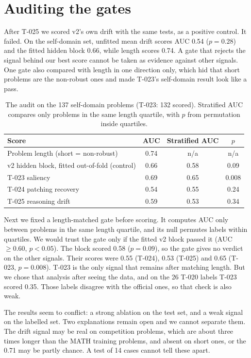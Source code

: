 \documentclass{article}
\begin{document}
\section{Auditing the gates}
\label{sec:audit}

After T-025 we scored v2's own drift with the same tests, as a positive control. It failed. On the self-domain set, unfitted mean drift scores AUC 0.54 ($p=0.28$) and the fitted hidden block 0.66, while length scores 0.74. A gate that rejects the signal behind our best score cannot be taken as evidence against other signals. One gate also compared with length in one direction only, which hid that short problems are the non-robust ones and made T-023's self-domain result look like a pass.

\begin{table}[h]
\centering
\small
\caption{The audit on the 137 self-domain problems (T-023: 132 scored). Stratified AUC compares only problems in the same length quartile, with $p$ from permutation inside quartiles.}
\label{tab:audit}
\begin{tabular}{lccc}
\toprule
Score & AUC & Stratified AUC & $p$ \\
\midrule
Problem length (short = non-robust) & 0.74 & n/a & n/a \\
v2 hidden block, fitted out-of-fold (control) & 0.66 & 0.58 & 0.09 \\
T-023 saliency & 0.69 & 0.65 & 0.008 \\
T-024 patching recovery & 0.54 & 0.55 & 0.24 \\
T-025 reasoning drift & 0.59 & 0.53 & 0.34 \\
\bottomrule
\end{tabular}
\end{table}

Next we fixed a length-matched gate before scoring. It computes AUC only between problems in the same length quartile, and its null permutes labels within quartiles. We would trust the gate only if the fitted v2 block passed it (AUC $\ge 0.60$, $p<0.05$). The block scored 0.58 ($p=0.09$), so the gate gives no verdict on the other signals. Their scores were 0.55 (T-024), 0.53 (T-025) and 0.65 (T-023, $p=0.008$). T-023 is the only signal that remains after matching length. But we chose that analysis after seeing the data, and on the 26 T-020 labels T-023 scored 0.35. Those labels disagree with the official ones, so that check is also weak.

The results seem to conflict: a strong ablation on the test set, and a weak signal on the labelled set. Two explanations remain open and we cannot separate them. The drift signal may be real on competition problems, which are about three times longer than the MATH training problems, and absent on short ones, or the 0.71 may be partly chance. A test of 14 cases cannot tell these apart.
\end{document}
